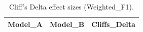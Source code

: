 \begin{table}[t]
\centering
\begin{tabular}{lll}
\toprule
Model_A & Model_B & Cliffs_Delta \\
\midrule
\bottomrule
\end{tabular}
\caption{Cliff's Delta effect sizes (Weighted_F1).}
\label{tab:cliffs_Weighted_F1}
\end{table}